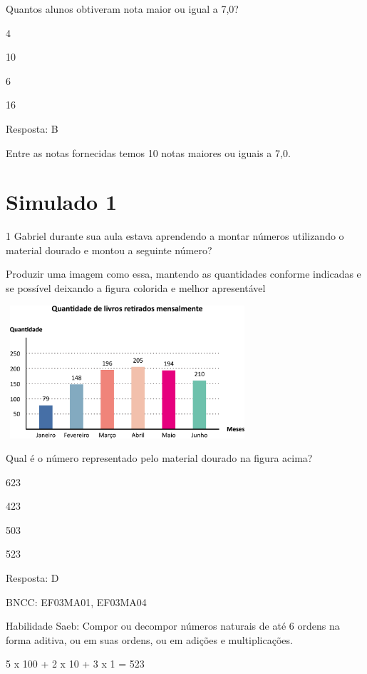 \begin{escolha}
Quantos alunos obtiveram nota maior ou igual a 7,0?

\begin{escolha}
\item
  4
\item
  10
\item
  6
\item
  16
\end{escolha}

Resposta: B

Entre as notas fornecidas temos 10 notas maiores ou iguais a 7,0.

\chapter{Simulado 1}

\num{1} Gabriel durante sua aula estava aprendendo a montar números utilizando o
material dourado e montou a seguinte número?

Produzir uma imagem como essa, mantendo as quantidades conforme
indicadas e se possível deixando a figura colorida e melhor apresentável

\includegraphics[width=3.55128in,height=1.93600in]{media/image106.png}

Qual é o número representado pelo material dourado na figura acima?

\begin{escolha}
\item
  623
\item
  423
\item
  503
\item
  523
\end{escolha}

Resposta: D

BNCC: EF03MA01, EF03MA04

Habilidade Saeb: Compor ou decompor números naturais de até 6 ordens na
forma aditiva, ou em suas ordens, ou em adições e multiplicações.

5 x 100 + 2 x 10 + 3 x 1 = 523


\end{escolha}
